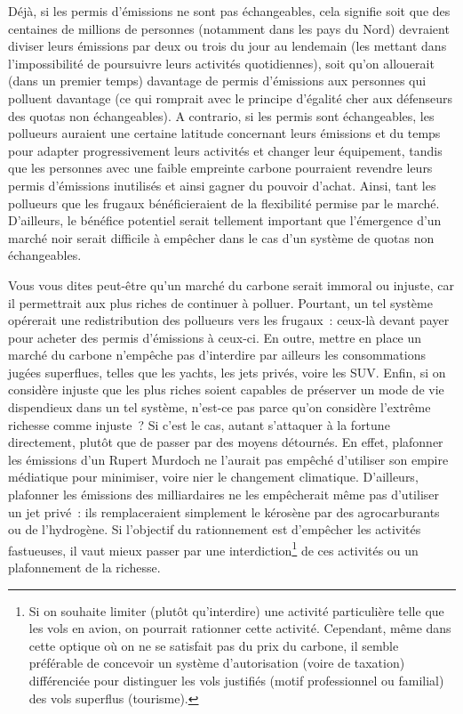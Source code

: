 \documentclass[a5paper,french]{memoir}
\begin{document}
Déjà, si les permis d'émissions ne sont pas échangeables, cela signifie soit que des centaines de millions de personnes (notamment dans les pays du Nord) devraient diviser leurs émissions par deux ou trois du jour au lendemain (les mettant dans l'impossibilité de poursuivre leurs activités quotidiennes), soit qu'on allouerait (dans un premier temps) davantage de permis d'émissions aux personnes qui polluent davantage (ce qui romprait avec le principe d'égalité cher aux défenseurs des quotas non échangeables). A contrario, si les permis sont échangeables, les pollueurs auraient une certaine latitude concernant leurs émissions et du temps pour adapter progressivement leurs activités et changer leur équipement, tandis que les personnes avec une faible empreinte carbone pourraient revendre leurs permis d'émissions inutilisés et ainsi gagner du pouvoir d'achat. Ainsi, tant les pollueurs que les frugaux bénéficieraient de la flexibilité permise par le marché. D'ailleurs, le bénéfice potentiel serait tellement important que l'émergence d'un marché noir serait difficile à empêcher dans le cas d'un système de quotas non échangeables. 

Vous vous dites peut-être qu'un marché du carbone serait immoral ou injuste, car il permettrait aux plus riches de continuer à polluer. Pourtant, un tel système opérerait une redistribution des pollueurs vers les frugaux~: ceux-là devant payer pour acheter des permis d'émissions à ceux-ci. En outre, mettre en place un marché du carbone n'empêche pas d'interdire par ailleurs les consommations jugées superflues, telles que les yachts, les jets privés, voire les SUV. Enfin, si on considère injuste que les plus riches soient capables de préserver un mode de vie dispendieux dans un tel système, n'est-ce pas parce qu'on considère l'extrême richesse comme injuste~? Si c'est le cas, autant s'attaquer à la fortune directement, plutôt que de passer par des moyens détournés. En effet, plafonner les émissions d'un Rupert Murdoch ne l'aurait pas empêché d'utiliser son empire médiatique pour minimiser, voire nier le changement climatique. D'ailleurs, plafonner les émissions des milliardaires ne les empêcherait même pas d'utiliser un jet privé~: ils remplaceraient simplement le kérosène par des agrocarburants ou de l'hydrogène. Si l'objectif du rationnement est d'empêcher les activités fastueuses, %
il vaut mieux passer par une interdiction\footnote{Si on souhaite limiter (plutôt qu'interdire) une activité particulière telle que les vols en avion, on pourrait rationner cette activité. Cependant, même dans cette optique où on ne se satisfait pas du prix du carbone, il semble préférable de concevoir un système d'autorisation (voire de taxation) différenciée pour distinguer les vols justifiés (motif professionnel ou familial) des vols superflus (tourisme). 
} de ces activités ou un plafonnement de la richesse.  %
\end{document}
